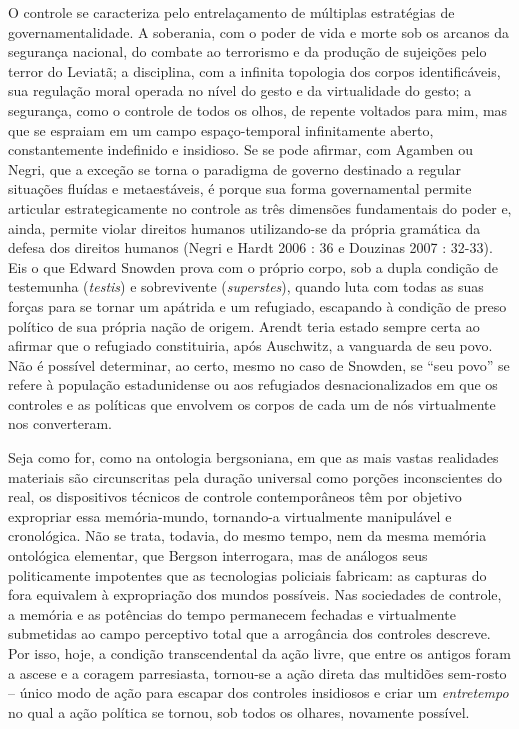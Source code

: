O controle se caracteriza pelo entrelaçamento de múltiplas estratégias
de governamentalidade. A soberania, com o poder de vida e morte sob os
arcanos da segurança nacional, do combate ao terrorismo e da produção de
sujeições pelo terror do Leviatã; a disciplina, com a infinita topologia
dos corpos identificáveis, sua regulação moral operada no nível do gesto
e da virtualidade do gesto; a segurança, como o controle de todos os
olhos, de repente voltados para mim, mas que se espraiam em um campo
espaço-temporal infinitamente aberto, constantemente indefinido e
insidioso. Se se pode afirmar, com Agamben ou Negri, que a exceção se
torna o paradigma de governo destinado a regular situações fluídas e
metaestáveis, é porque sua forma governamental permite articular
estrategicamente no controle as três dimensões fundamentais do poder e,
ainda, permite violar direitos humanos utilizando-se da própria
gramática da defesa dos direitos humanos (Negri e Hardt 2006 : 36 e
Douzinas 2007 : 32-33). Eis o que Edward Snowden prova com o próprio
corpo, sob a dupla condição de testemunha (\emph{testis}) e sobrevivente
(\emph{superstes}), quando luta com todas as suas forças para se tornar
um apátrida e um refugiado, escapando à condição de preso político de
sua própria nação de origem. Arendt teria estado sempre certa ao afirmar
que o refugiado constituiria, após Auschwitz, a vanguarda de seu povo.
Não é possível determinar, ao certo, mesmo no caso de Snowden, se ``seu
povo'' se refere à população estadunidense ou aos refugiados
desnacionalizados em que os controles e as políticas que envolvem os
corpos de cada um de nós virtualmente nos converteram.

Seja como for, como na ontologia bergsoniana, em que as mais vastas
realidades materiais são circunscritas pela duração universal como
porções inconscientes do real, os dispositivos técnicos de controle
contemporâneos têm por objetivo expropriar essa memória-mundo,
tornando-a virtualmente manipulável e cronológica. Não se trata,
todavia, do mesmo tempo, nem da mesma memória ontológica elementar, que
Bergson interrogara, mas de análogos seus politicamente impotentes que
as tecnologias policiais fabricam: as capturas do fora equivalem à
expropriação dos mundos possíveis. Nas sociedades de controle, a memória
e as potências do tempo permanecem fechadas e virtualmente submetidas ao
campo perceptivo total que a arrogância dos controles descreve. Por
isso, hoje, a condição transcendental da ação livre, que entre os
antigos foram a ascese e a coragem parresiasta, tornou-se a ação direta
das multidões sem-rosto -- único modo de ação para escapar dos controles
insidiosos e criar um \emph{entretempo} no qual a ação política se
tornou, sob todos os olhares, novamente possível.

